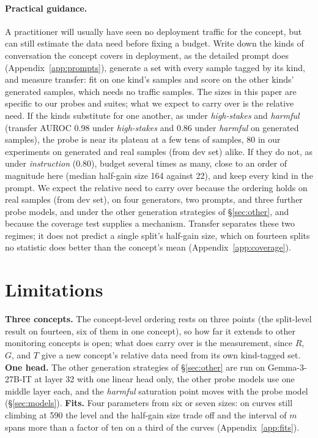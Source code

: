 \documentclass{article} %
\newcommand{\hs}{\emph{high-stakes}}
\newcommand{\harm}{\emph{harmful}}
\newcommand{\instr}{\emph{instruction}}
\begin{document}
\paragraph{Practical guidance.}
A practitioner will usually have seen no deployment traffic for the concept, but can still estimate the data need before fixing a budget. Write down the kinds of conversation the concept covers in deployment, as the detailed prompt does (Appendix~\ref{app:prompts}), generate a set with every sample tagged by its kind, and measure transfer: fit on one kind's samples and score on the other kinds' generated samples, which needs no traffic samples. The sizes in this paper are specific to our probes and suites; what we expect to carry over is the relative need. If the kinds substitute for one another, as under \hs{} and \harm{} (transfer AUROC 0.98 under \hs{} and 0.86 under \harm{} on generated samples), the probe is near its plateau at a few tens of samples, 80 in our experiments on generated and real samples (from dev set) alike. If they do not, as under \instr{} (0.80), budget several times as many, close to an order of magnitude here (median half-gain size 164 against 22), and keep every kind in the prompt. We expect the relative need to carry over because the ordering holds on real samples (from dev set), on four generators, two prompts, and three further probe models, and under the other generation strategies of \S\ref{sec:other}, and because the coverage test supplies a mechanism. Transfer separates these two regimes; it does not predict a single split's half-gain size, which on fourteen splits no statistic does better than the concept's mean (Appendix~\ref{app:coverage}).

\section{Limitations}
\label{sec:limitations}
\textbf{Three concepts.} The concept-level ordering rests on three points (the split-level result on fourteen, six of them in one concept), so how far it extends to other monitoring concepts is open; what does carry over is the measurement, since $R$, $G$, and $T$ give a new concept's relative data need from its own kind-tagged set. \textbf{One head.} The other generation strategies of \S\ref{sec:other} are run on Gemma-3-27B-IT at layer 32 with one linear head only, the other probe models use one middle layer each, and the \harm{} saturation point moves with the probe model (\S\ref{sec:models}). \textbf{Fits.} Four parameters from six or seven sizes: on curves still climbing at 590 the level and the half-gain size trade off and the interval of $m$ spans more than a factor of ten on a third of the curves (Appendix~\ref{app:fits}).
\end{document}
